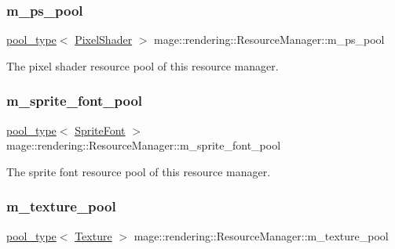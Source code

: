\subsubsection{\texorpdfstring{m\+\_\+ps\+\_\+pool}{m\_ps\_pool}}
{\footnotesize\ttfamily \mbox{\hyperlink{classmage_1_1rendering_1_1_resource_manager_ab21a4e280087032ee533f267bd9bf602}{pool\+\_\+type}}$<$ \mbox{\hyperlink{namespacemage_1_1rendering_a19905114913398d5073148f6c416e1b7}{Pixel\+Shader}} $>$ mage\+::rendering\+::\+Resource\+Manager\+::m\+\_\+ps\+\_\+pool\hspace{0.3cm}{\ttfamily [private]}}

The pixel shader resource pool of this resource manager. \mbox{\label{classmage_1_1rendering_1_1_resource_manager_a0319ef8aad59a69098e6c0a89b6c912e}} 
\subsubsection{\texorpdfstring{m\+\_\+sprite\+\_\+font\+\_\+pool}{m\_sprite\_font\_pool}}
{\footnotesize\ttfamily \mbox{\hyperlink{classmage_1_1rendering_1_1_resource_manager_ab21a4e280087032ee533f267bd9bf602}{pool\+\_\+type}}$<$ \mbox{\hyperlink{classmage_1_1rendering_1_1_sprite_font}{Sprite\+Font}} $>$ mage\+::rendering\+::\+Resource\+Manager\+::m\+\_\+sprite\+\_\+font\+\_\+pool\hspace{0.3cm}{\ttfamily [private]}}

The sprite font resource pool of this resource manager. \mbox{\label{classmage_1_1rendering_1_1_resource_manager_aaf5faede84cdce3bd2589936d5ba3b18}} 
\subsubsection{\texorpdfstring{m\+\_\+texture\+\_\+pool}{m\_texture\_pool}}
{\footnotesize\ttfamily \mbox{\hyperlink{classmage_1_1rendering_1_1_resource_manager_ab21a4e280087032ee533f267bd9bf602}{pool\+\_\+type}}$<$ \mbox{\hyperlink{classmage_1_1rendering_1_1_texture}{Texture}} $>$ mage\+::rendering\+::\+Resource\+Manager\+::m\+\_\+texture\+\_\+pool\hspace{0.3cm}{\ttfamily [private]}}

